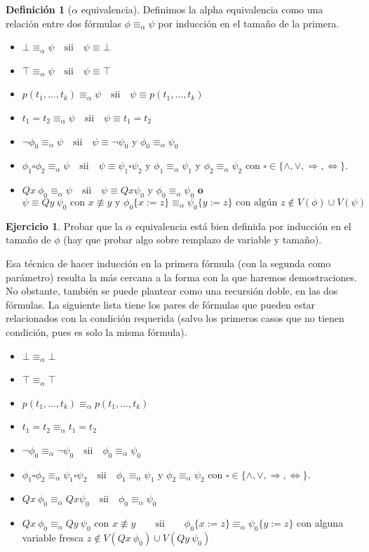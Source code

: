 \documentclass[a4paper, 12pt]{report}
\newcommand{\Ra}{\Rightarrow}
\newcommand{\te}{\text}
\newcommand{\Lra}{\Leftrightarrow}
\theoremstyle{definition}
\newtheorem{definicion}[teorema]{Definición}
\newtheorem{ejercicio}{Ejercicio}[section]
\begin{document}
\begin{definicion}[$\alpha$ equivalencia]
	Definimos la alpha equivalencia como una relación entre dos fórmulas $\phi\equiv_\alpha\psi$ por inducción en el tamaño de la primera.
	\begin{itemize}
		\item $\bot\equiv_\alpha\psi \quad\te{sii}\quad \psi\equiv\bot$
		\item $\top\equiv_\alpha\psi \quad\te{sii}\quad \psi\equiv\top$
		\item $p(t_1,\dots,t_k)\equiv_\alpha\psi \quad\te{sii}\quad\psi\equiv p(t_1,\dots,t_k)$
		\item $t_1=t_2\equiv_\alpha\psi \quad\te{sii}\quad\psi\equiv t_1=t_2$
		\item $\lnot\phi_0\equiv_\alpha\psi \quad\te{sii}\quad \psi\equiv\lnot\psi_0$ y $\phi_0\equiv_\alpha\psi_0$
		\item $\phi_1\square\phi_2\equiv_\alpha\psi \quad\te{sii}\quad \psi\equiv\psi_1\square\psi_2$ y $\phi_1\equiv_\alpha\psi_1$ y $\phi_2\equiv_\alpha\psi_2$ \quad con $\square\in\{\wedge,\vee,\Ra,\Lra\}$.
		\item $Qx~\phi_0\equiv_\alpha\psi \quad\te{sii}\quad
			\psi\equiv Qx\psi_0\te{ y }\phi_0\equiv_\alpha\psi_0$ \textbf{o}
		$$\psi\equiv Qy~\psi_0\te{ con }x\not\equiv y\te{ y }\phi_0\{x:=z\}\equiv_\alpha\psi_0\{y:=z\}\te{ con algún }z\not\in V(\phi)\cup V(\psi)
		 $$
	\end{itemize}
\end{definicion}
\begin{ejercicio}
	Probar que la $\alpha$ equivalencia está bien definida por inducción en el tamaño de $\phi$ (hay que probar algo sobre remplazo de variable y tamaño).
\end{ejercicio}
Esa técnica de hacer inducción en la primera fórmula (con la segunda como parámetro) resulta la más cercana a la forma con la que haremos demostraciones. No obstante, también se puede plantear como una recursión doble, en las dos fórmulas. La siguiente lista tiene los pares de fórmulas que pueden estar relacionados con la condición requerida (salvo los primeros casos que no tienen condición, pues es solo la misma fórmula).
\begin{itemize}
	\item $\bot\equiv_\alpha\bot$
	\item $\top\equiv_\alpha\top$
	\item $p(t_1,\dots,t_k)\equiv_\alpha p(t_1,\dots,t_k)$
	\item $t_1=t_2\equiv_\alpha t_1=t_2$
	\item $\lnot\phi_0\equiv_\alpha\lnot\psi_0 \quad\te{sii}\quad \phi_0\equiv_\alpha\psi_0$
	\item $\phi_1\square\phi_2\equiv_\alpha\psi_1\square\psi_2 \quad\te{sii}\quad \phi_1\equiv_\alpha\psi_1$ y $\phi_2\equiv_\alpha\psi_2$ \quad con $\square\in\{\wedge,\vee,\Ra,\Lra\}$.
	\item $Qx~\phi_0\equiv_\alpha  Qx\psi_0 \quad\te{sii}\quad
    \phi_0\equiv_\alpha\psi_0$ 
	\item $Qx~\phi_0\equiv_\alpha Qy~\psi_0\te{ con }x\not\equiv y \qquad\te{sii}\qquad\phi_0\{x:=z\}\equiv_\alpha\psi_0\{y:=z\}$ con alguna variable fresca  $z\not\in V(Qx~\phi_0)\cup V(Qy~\psi_0)
	$
\end{itemize}
\end{document}
